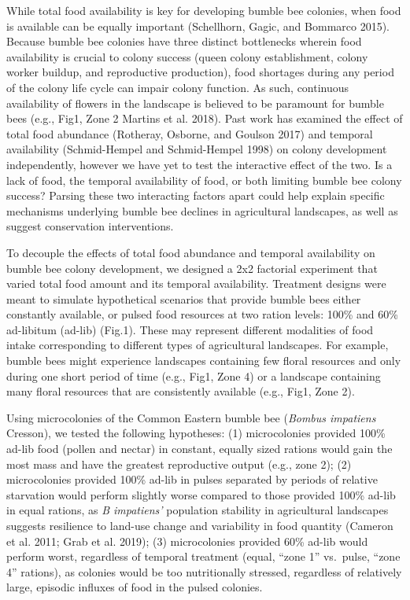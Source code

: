 \documentclass[11pt,]{article}
\begin{document}
While total food availability is key for developing bumble bee colonies,
when food is available can be equally important (Schellhorn, Gagic, and
Bommarco 2015). Because bumble bee colonies have three distinct
bottlenecks wherein food availability is crucial to colony success
(queen colony establishment, colony worker buildup, and reproductive
production), food shortages during any period of the colony life cycle
can impair colony function. As such, continuous availability of flowers
in the landscape is believed to be paramount for bumble bees (e.g.,
Fig1, Zone 2 Martins et al. 2018). Past work has examined the effect of
total food abundance (Rotheray, Osborne, and Goulson 2017) and temporal
availability (Schmid-Hempel and Schmid-Hempel 1998) on colony
development independently, however we have yet to test the interactive
effect of the two. Is a lack of food, the temporal availability of food,
or both limiting bumble bee colony success? Parsing these two
interacting factors apart could help explain specific mechanisms
underlying bumble bee declines in agricultural landscapes, as well as
suggest conservation interventions.

To decouple the effects of total food abundance and temporal
availability on bumble bee colony development, we designed a 2x2
factorial experiment that varied total food amount and its temporal
availability. Treatment designs were meant to simulate hypothetical
scenarios that provide bumble bees either constantly available, or
pulsed food resources at two ration levels: 100\% and 60\% ad-libitum
(ad-lib) (Fig.1). These may represent different modalities of food
intake corresponding to different types of agricultural landscapes. For
example, bumble bees might experience landscapes containing few floral
resources and only during one short period of time (e.g., Fig1, Zone 4)
or a landscape containing many floral resources that are consistently
available (e.g., Fig1, Zone 2).

Using microcolonies of the Common Eastern bumble bee (\emph{Bombus
impatiens} Cresson), we tested the following hypotheses: (1)
microcolonies provided 100\% ad-lib food (pollen and nectar) in
constant, equally sized rations would gain the most mass and have the
greatest reproductive output (e.g., zone 2); (2) microcolonies provided
100\% ad-lib in pulses separated by periods of relative starvation would
perform slightly worse compared to those provided 100\% ad-lib in equal
rations, as \emph{B impatiens'} population stability in agricultural
landscapes suggests resilience to land-use change and variability in
food quantity (Cameron et al. 2011; Grab et al. 2019); (3) microcolonies
provided 60\% ad-lib would perform worst, regardless of temporal
treatment (equal, ``zone 1'' vs.~pulse, ``zone 4'' rations), as colonies
would be too nutritionally stressed, regardless of relatively large,
episodic influxes of food in the pulsed colonies.
\end{document}
